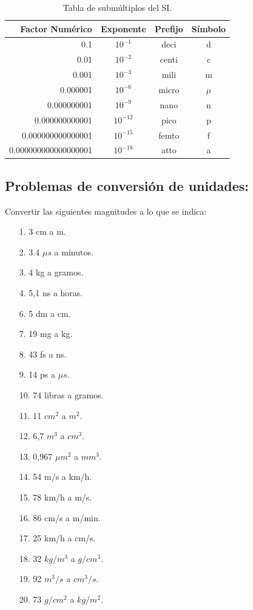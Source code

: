 \documentclass[a5paper,pagesize,10pt,bibtotoc,pointlessnumbers,
normalheadings,DIV=9,fleqn,x11names,table,twoside=false]{scrbook}
\begin{document}
\begin{table}[h]
 \begin{center}
\begin{tabular}{rccc}
\hline
Factor Numérico & Exponente & Prefijo & Símbolo\\
\hline
0.1 & $10^{-1}$ & deci & d\\
0.01 & $10^{-2}$ & centi & c\\
0.001 & $10^{-3}$ & mili & m\\
0.000001 & $10^{-6}$ & micro & $\mu$\\
0.000000001 & $10^{-9}$ & nano  & n\\
0.000000000001 & $10^{-12}$ & pico & p\\
0.000000000000001 & $10^{-15}$ & femto & f\\
0.000000000000000001 & $10^{-18}$  & atto & a\\
\hline
\end{tabular}
\caption{Tabla de submúltiplos del SI.}
 \end{center}
 \end{table}
 
\subsection{Problemas de conversión de unidades:}
Convertir las siguientes magnitudes a lo que se indica:
\begin{itemize}
 \item[1.] 3 cm a m.
 \item[2.] 3.4 $\mu s$ a minutos.
 \item[3.] 4 kg a gramos.
 \item[4.] 5,1 ns a horas.
 \item[6.] 5 dm a cm.
 \item[7.] 19 mg a kg.
 \item[8.] 43 fs a ns.
 \item[9.] 14 ps a $\mu s$.
 \item[10.] 74 libras a gramos.
 \item[11.] 11 $cm^2$ a $m^2$.
 \item[12.] 6,7 $m^3$ a $cm^3$.
 \item[13.] 0,967 $\mu m^2$ a $mm^3$.
 \item[14.] 54 m/s a km/h.
 \item[15.] 78 km/h a m/s.
 \item[16.] 86 cm/s a m/min.
 \item[17.] 25 km/h a cm/s.
 \item[18.] 32 $kg/m^3$ a $g/cm^3$.
 \item[19.] 92 $m^3/s$ a $cm^3/s$.
 \item[20.] 73 $g/cm^2$ a $kg/m^2$.
\end{itemize}
\end{document}
